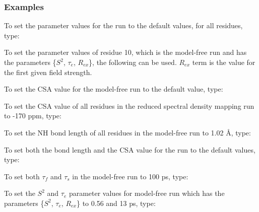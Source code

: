 \subsubsection{Examples}

To set the parameter values for the run  to the default values, for all residues, type:



To set the parameter values of residue 10, which is the model-free run  and has the parameters \{$S^2$, $\tau_e$, $R_{ex}$\}, the following can be used.  $R_{ex}$ term is the value for the first given field strength.




To set the CSA value for the model-free run  to the default value, type:



To set the CSA value of all residues in the reduced spectral density mapping run  to -170 ppm, type:




To set the NH bond length of all residues in the model-free run  to 1.02 \AA, type:




To set both the bond length and the CSA value for the run  to the default values, type:



To set both $\tau_f$ and $\tau_s$ in the model-free run  to 100 ps, type:




To set the $S^2$ and $\tau_e$ parameter values for model-free run  which has the parameters \{$S^2$, $\tau_e$, $R_{ex}$\} to 0.56 and 13 ps, type:


